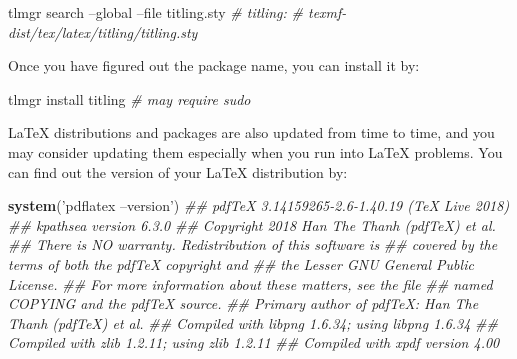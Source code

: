 \documentclass[
  12pt,
]{krantz}
\makeatletter
\newenvironment{Shaded}{\begin{snugshade}}{\end{snugshade}}
\newcommand{\CommentTok}[1]{\textcolor[rgb]{0.56,0.35,0.01}{\textit{#1}}}
\newcommand{\ExtensionTok}[1]{#1}
\newcommand{\KeywordTok}[1]{\textcolor[rgb]{0.13,0.29,0.53}{\textbf{#1}}}
\newcommand{\NormalTok}[1]{#1}
\newcommand{\StringTok}[1]{\textcolor[rgb]{0.31,0.60,0.02}{#1}}
\newenvironment{kframe}{%
\medskip{}
\setlength{\fboxsep}{.8em}
 \def\at@end@of@kframe{}%
 \ifinner\ifhmode%
  \def\at@end@of@kframe{\end{minipage}}%
  \begin{minipage}{\columnwidth}%
 \fi\fi%
 \def\FrameCommand##1{\hskip\@totalleftmargin \hskip-\fboxsep
 \colorbox{shadecolor}{##1}\hskip-\fboxsep
     \hskip-\linewidth \hskip-\@totalleftmargin \hskip\columnwidth}%
 \MakeFramed {\advance\hsize-\width
   \@totalleftmargin\z@ \linewidth\hsize
   \@setminipage}}%
 {\par\unskip\endMakeFramed%
 \at@end@of@kframe}
\renewenvironment{Shaded}{\begin{kframe}}{\end{kframe}}
\makeatother
\begin{document}
\begin{Shaded}
\begin{Highlighting}[]
\ExtensionTok{tlmgr}\NormalTok{ search --global --file titling.sty}
\CommentTok{# titling:}
\CommentTok{#    texmf-dist/tex/latex/titling/titling.sty}
\end{Highlighting}
\end{Shaded}

Once you have figured out the package name, you can install it by:

\begin{Shaded}
\begin{Highlighting}[]
\ExtensionTok{tlmgr}\NormalTok{ install titling  }\CommentTok{# may require sudo}
\end{Highlighting}
\end{Shaded}

LaTeX distributions and packages are also updated from time to time, and you may consider updating them especially when you run into LaTeX problems. You can find out the version of your LaTeX distribution by:

\begin{Shaded}
\begin{Highlighting}[]
\KeywordTok{system}\NormalTok{(}\StringTok{'pdflatex --version'}\NormalTok{)}
\CommentTok{## pdfTeX 3.14159265-2.6-1.40.19 (TeX Live 2018)}
\CommentTok{## kpathsea version 6.3.0}
\CommentTok{## Copyright 2018 Han The Thanh (pdfTeX) et al.}
\CommentTok{## There is NO warranty.  Redistribution of this software is}
\CommentTok{## covered by the terms of both the pdfTeX copyright and}
\CommentTok{## the Lesser GNU General Public License.}
\CommentTok{## For more information about these matters, see the file}
\CommentTok{## named COPYING and the pdfTeX source.}
\CommentTok{## Primary author of pdfTeX: Han The Thanh (pdfTeX) et al.}
\CommentTok{## Compiled with libpng 1.6.34; using libpng 1.6.34}
\CommentTok{## Compiled with zlib 1.2.11; using zlib 1.2.11}
\CommentTok{## Compiled with xpdf version 4.00}
\end{Highlighting}
\end{Shaded}
\end{document}
